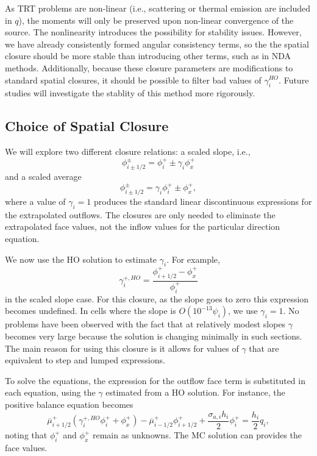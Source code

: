 As TRT problems are non-linear (i.e., scattering or thermal emission are included in
$q$), the moments will only be preserved upon non-linear convergence of the source.  The
nonlinearity introduces the possibility for stability
issues.  However, we have already consistently formed angular consistency terms, so the
the spatial closure should be more stable than introducing other terms, such as
in NDA methods.  Additionally, because these closure
parameters are modifications to standard spatial closures, it should be possible to filter bad
values of $\gamma^{HO}_i$.  Future studies will investigate the stablity of
this method more rigorously.

\subsection{Choice of Spatial Closure}
\label{sec:spat_clos_options}

We will
explore two different closure relations: a scaled slope, i.e.,
\begin{equation}
    \phi_{i\pm1/2}^\pm = \phi_i^+ \pm \gamma_i \phi_x^+
\end{equation}
and a scaled average
\begin{equation}
    \phi_{i\pm1/2}^\pm = \gamma_i \phi_i^+ \pm \phi_x^+,
\end{equation}
where a value of $\gamma_i = 1$ produces the standard linear discontinuous expressions for
the extrapolated outflows.  The 
closures are only needed to eliminate the extrapolated face values, not the inflow values
for the particular direction equation.

We now use the HO solution to estimate $\gamma_i$.  For example, 
\begin{equation}
    \gamma_i^{+,HO} = \frac{\phi_{i+1/2}^+ - \phi_x^+}{\phi_i^+}
\end{equation}
in the scaled slope case.  For this closure, as the slope goes to zero this expression
becomes undefined.  In cells where the slope is $O(10^{-13} \psi_i)$, we use $\gamma_i=1$.
No problems have been observed with the fact that at relatively modest slopes $\gamma$
becomes very large because the solution is changing minimally in such sections. 
The main reason for using this closure is it allows for values of $\gamma$ that are
equivalent to step and lumped expressions.

To solve the equations, the expression for the outflow face term is substituted in each equation, using the
$\gamma$ estimated from a HO solution.
For instance, the positive balance equation becomes
\begin{equation}
    \overline\mu^+_{i+1/2}\left( \gamma_i^{+,HO} \phi_i^+ + \phi_x^+ \right) - \overline\mu^+_{i-1/2}\phi_{i+1/2}^+ +
    \frac{\sigma_{a,i}h_i}{2} \phi_i^+ = \frac{h_i}{2} q_i,
    \label{eqn:clsd_posbal}
\end{equation}
noting that $\phi_i^+$ and $\phi_x^+$ remain as unknowns. The MC solution can provides the
face values.

